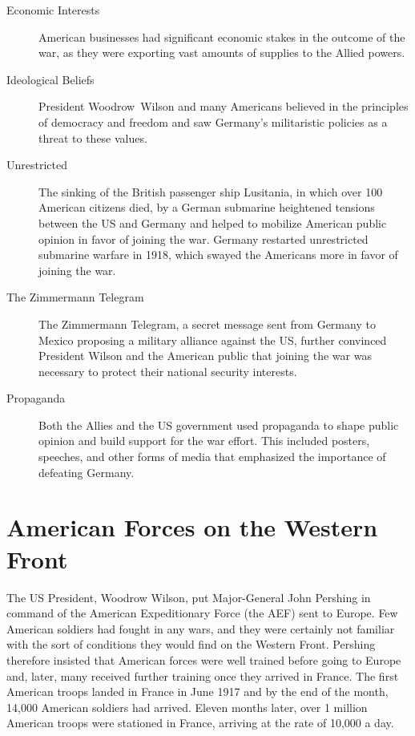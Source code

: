 \documentclass[a4paper,numbers=endperiod,most,twoside,english,final,openany]{scrbook} %
\begin{document}
\begin{description}
	\item[Economic Interests] American businesses had significant economic stakes in the outcome of the war, as they were exporting vast amounts of supplies to the Allied powers.
	\item[Ideological Beliefs] President Woodrow~Wilson and many Americans believed in the principles of democracy and freedom and saw Germany's militaristic policies as a threat to these values.
	\item[Unrestricted] The sinking of the British passenger ship Lusitania, in which over 100 American citizens died, by a German submarine heightened tensions between the US and Germany and helped to mobilize American public opinion in favor of joining the war. Germany restarted unrestricted submarine warfare in 1918, which swayed the Americans more in favor of joining the war.
	\item[The Zimmermann Telegram] The Zimmermann Telegram, a secret message sent from Germany to Mexico proposing a military alliance against the US, further convinced President Wilson and the American public that joining the war was necessary to protect their national security interests.
	\item[Propaganda] Both the Allies and the US government used propaganda to shape public opinion and build support for the war effort. This included posters, speeches, and other forms of media that emphasized the importance of defeating Germany.
\end{description}

\section{American Forces on the Western Front}

The US President, Woodrow Wilson, put Major-General John Pershing in
command of the American Expeditionary Force (the AEF) sent to Europe. Few American soldiers had fought in any wars, and they were certainly not familiar with the sort of conditions they would find on the Western Front. Pershing therefore insisted that American forces were well trained before going to Europe and, later, many received further training once they arrived in France. The first American troops landed in France in June 1917 and by the end of the month, 14,000 American soldiers had arrived. Eleven months later, over 1 million American troops were stationed in France, arriving at the rate of 10,000 a day.
\end{document}
